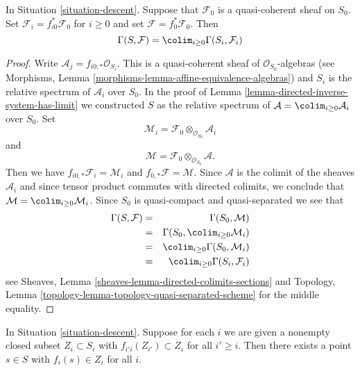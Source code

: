 \begin{lemma}
\label{lemma-descend-section}
In Situation \ref{situation-descent}.
Suppose that $\mathcal{F}_0$ is a quasi-coherent sheaf on $S_0$.
Set $\mathcal{F}_i = f_{i0}^*\mathcal{F}_0$ for $i \geq 0$ and set
$\mathcal{F} = f_0^*\mathcal{F}_0$.
Then
$$
\Gamma(S, \mathcal{F}) = \colim_{i \geq 0} \Gamma(S_i, \mathcal{F}_i)
$$
\end{lemma}

\begin{proof}
Write $\mathcal{A}_j = f_{i0, *} \mathcal{O}_{S_i}$.
This is a quasi-coherent sheaf of $\mathcal{O}_{S_0}$-algebras
(see Morphisms, Lemma \ref{morphisms-lemma-affine-equivalence-algebras})
and $S_i$ is the relative spectrum of $\mathcal{A}_i$ over $S_0$.
In the proof of Lemma \ref{lemma-directed-inverse-system-has-limit}
we constructed $S$ as the relative spectrum of
$\mathcal{A} = \colim_{i \geq 0} \mathcal{A}_i$
over $S_0$. Set
$$
\mathcal{M}_i = \mathcal{F}_0 \otimes_{\mathcal{O}_{S_0}} \mathcal{A}_i
$$
and
$$
\mathcal{M} = \mathcal{F}_0 \otimes_{\mathcal{O}_{S_0}} \mathcal{A}.
$$
Then we have $f_{i0, *} \mathcal{F}_i = \mathcal{M}_i$
and $f_{0, *}\mathcal{F} = \mathcal{M}$. Since $\mathcal{A}$
is the colimit of the sheaves $\mathcal{A}_i$ and since tensor
product commutes with directed colimits, we conclude that
$\mathcal{M} = \colim_{i \geq 0} \mathcal{M}_i$.
Since $S_0$ is quasi-compact and quasi-separated we see that
\begin{eqnarray*}
\Gamma(S, \mathcal{F})
& = &
\Gamma(S_0, \mathcal{M}) \\
& = &
\Gamma(S_0, \colim_{i \geq 0} \mathcal{M}_i) \\
& = &
\colim_{i \geq 0} \Gamma(S_0, \mathcal{M}_i) \\
& = &
\colim_{i \geq 0} \Gamma(S_i, \mathcal{F}_i)
\end{eqnarray*}
see Sheaves, Lemma \ref{sheaves-lemma-directed-colimits-sections} and
Topology, Lemma \ref{topology-lemma-topology-quasi-separated-scheme}
for the middle equality.
\end{proof}

\begin{lemma}
\label{lemma-limit-closed-nonempty}
In Situation \ref{situation-descent}.
Suppose for each $i$ we are given a nonempty closed subset
$Z_i \subset S_i$ with $f_{i'i}(Z_{i'}) \subset Z_i$ for all
$i' \geq i$.
Then there exists a point $s \in S$ with $f_i(s) \in Z_i$ for
all $i$.
\end{lemma}

